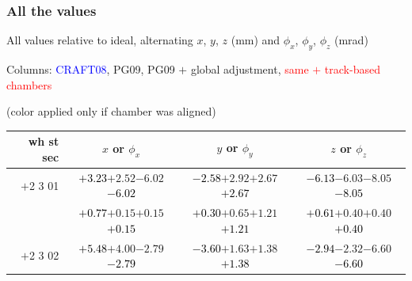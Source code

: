\documentclass[compress]{beamer}
\begin{document}
\begin{frame}
\frametitle{All the values}
\tiny

All values relative to ideal, alternating $x$, $y$, $z$ (mm) and $\phi_x$, $\phi_y$, $\phi_z$ (mrad)

Columns: \textcolor{blue}{CRAFT08}, PG09, PG09 $+$ global adjustment, \textcolor{red}{same $+$ track-based chambers}

\hfill (color applied only if chamber was aligned)

\vfill
\renewcommand{\arraystretch}{1.1}
\begin{tabular}{r | c | c | c}
wh st sec & $x$ or $\phi_x$ & $y$ or $\phi_y$ & $z$ or $\phi_z$ \\\hline
$+$2 3 01 & \textcolor{black}{$+3.23$}\hspace{0.1 cm}$+2.52$\hspace{0.1 cm}$-6.02$\hspace{0.1 cm}\textcolor{black}{$-6.02$} & \textcolor{black}{$-2.58$}\hspace{0.1 cm}$+2.92$\hspace{0.1 cm}$+2.67$\hspace{0.1 cm}\textcolor{black}{$+2.67$} & \textcolor{black}{$-6.13$}\hspace{0.1 cm}$-6.03$\hspace{0.1 cm}$-8.05$\hspace{0.1 cm}\textcolor{black}{$-8.05$} \\
          & \textcolor{black}{$+0.77$}\hspace{0.1 cm}$+0.15$\hspace{0.1 cm}$+0.15$\hspace{0.1 cm}\textcolor{black}{$+0.15$} & \textcolor{black}{$+0.30$}\hspace{0.1 cm}$+0.65$\hspace{0.1 cm}$+1.21$\hspace{0.1 cm}\textcolor{black}{$+1.21$} & \textcolor{black}{$+0.61$}\hspace{0.1 cm}$+0.40$\hspace{0.1 cm}$+0.40$\hspace{0.1 cm}\textcolor{black}{$+0.40$} \\
$+$2 3 02 & \textcolor{black}{$+5.48$}\hspace{0.1 cm}$+4.00$\hspace{0.1 cm}$-2.79$\hspace{0.1 cm}\textcolor{black}{$-2.79$} & \textcolor{black}{$-3.60$}\hspace{0.1 cm}$+1.63$\hspace{0.1 cm}$+1.38$\hspace{0.1 cm}\textcolor{black}{$+1.38$} & \textcolor{black}{$-2.94$}\hspace{0.1 cm}$-2.32$\hspace{0.1 cm}$-6.60$\hspace{0.1 cm}\textcolor{black}{$-6.60$} \\

\end{tabular}
\end{frame}
\end{document}
